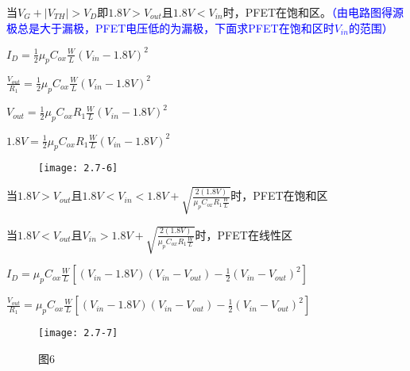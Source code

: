 当$V_{G}+|V_{TH}|>V_{D}$即$1.8V>V_{out}$且$1.8V<V_{in}$时，PFET在饱和区。\textcolor{blue}{（由电路图得源极总是大于漏极，PFET电压低的为漏极，下面求PFET在饱和区时$V_{in}$的范围）}

$I_D=\frac{1}{2}\mu_pC_{ox}\frac{W}{L}(V_{in}-1.8V)^2$

$\frac{V_{out}}{R_1}=\frac{1}{2}\mu_pC_{ox}\frac{W}{L}(V_{in}-1.8V)^2$

$V_{out}=\frac{1}{2}\mu_pC_{ox}{R_1}\frac{W}{L}(V_{in}-1.8V)^2$

$1.8V=\frac{1}{2}\mu_pC_{ox}{R_1}\frac{W}{L}(V_{in}-1.8V)^2$

\begin{figure}[H] %
	\begin{minipage}{\linewidth}
		\texttt{[image: 2.7-6]}
	\end{minipage}
\end{figure}

当$1.8V>V_{out}$且$1.8V<V_{in}<1.8V+\sqrt{\frac{2(1.8V)}{\mu_pC_{ox}{R_1}\frac{W}{L}}}$时，PFET在饱和区

当$1.8V<V_{out}$且$V_{in}>1.8V+\sqrt{\frac{2(1.8V)}{\mu_pC_{ox}{R_1}\frac{W}{L}}}$时，PFET在线性区

$I_D=\mu_pC_{ox}\frac{W}{L}[(V_{in}-1.8V)(V_{in}-V_{out})-\frac{1}{2}(V_{in}-V_{out})^2]$

$\frac{V_{out}}{R_1}=\mu_pC_{ox}\frac{W}{L}[(V_{in}-1.8V)(V_{in}-V_{out})-\frac{1}{2}(V_{in}-V_{out})^2]$

















\begin{figure}[H] %
	\begin{minipage}{\linewidth}
		\texttt{[image: 2.7-7]}
	\end{minipage}
	\caption*{图6} %
\end{figure}














